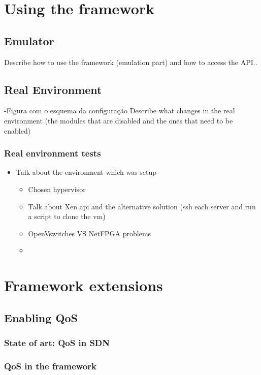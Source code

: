 \documentclass[12pt,english,oneside]{book}
\begin{document}
\section{Using the framework}

\subsection{Emulator}

Describe how to use the framework (emulation part) and how to access the API..

\subsection{Real Environment}

-Figura com o esquema da configuração
Describe what changes in the real environment (the modules that are disabled and the ones that need to be enabled)
\subsubsection{Real environment tests}
\begin{itemize}
  \item Talk about the environment which was setup
  \begin{itemize}
    \item Chosen hypervisor
    \item Talk about Xen api and the alternative solution (ssh each server and run a script to clone the vm)
    \item OpenVswitches VS NetFPGA problems
    \item 
  \end{itemize}
\end{itemize}

\section{Framework extensions \label{Sec:fraext} }

\subsection{Enabling QoS}
\subsubsection{State of art: QoS in SDN}
\subsubsection{QoS in the framework}
\newpage
\end{document}
